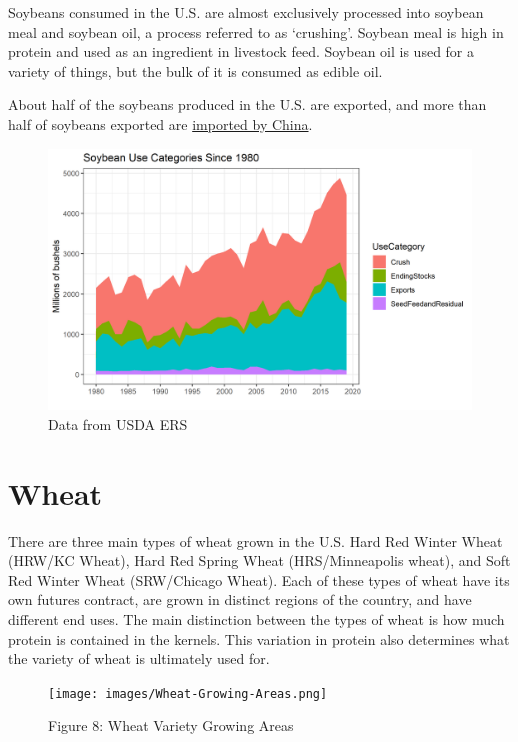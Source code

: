 \documentclass[
]{book}
\begin{document}
Soybeans consumed in the U.S. are almost exclusively processed into soybean meal and soybean oil, a process referred to as `crushing'. Soybean meal is high in protein and used as an ingredient in livestock feed. Soybean oil is used for a variety of things, but the bulk of it is consumed as edible oil.

About half of the soybeans produced in the U.S. are exported, and more than half of soybeans exported are \href{http://farmdocdaily.illinois.edu/2015/03/footprint-of-chinese-demand-for-us-soybeans.html}{imported by China}.

\begin{figure}
\centering
\includegraphics{assets/PrimerforGrain_SoyUse.png}
\caption{Data from USDA ERS}
\end{figure}

\hypertarget{wheat}{%
\section{Wheat}\label{wheat}}

There are three main types of wheat grown in the U.S. Hard Red Winter Wheat (HRW/KC Wheat), Hard Red Spring Wheat (HRS/Minneapolis wheat), and Soft Red Winter Wheat (SRW/Chicago Wheat). Each of these types of wheat have its own futures contract, are grown in distinct regions of the country, and have different end uses. The main distinction between the types of wheat is how much protein is contained in the kernels. This variation in protein also determines what the variety of wheat is ultimately used for.

\begin{figure}
\centering
\texttt{[image: images/Wheat-Growing-Areas.png]}
\caption{Figure 8: Wheat Variety Growing Areas}
\end{figure}
\end{document}
